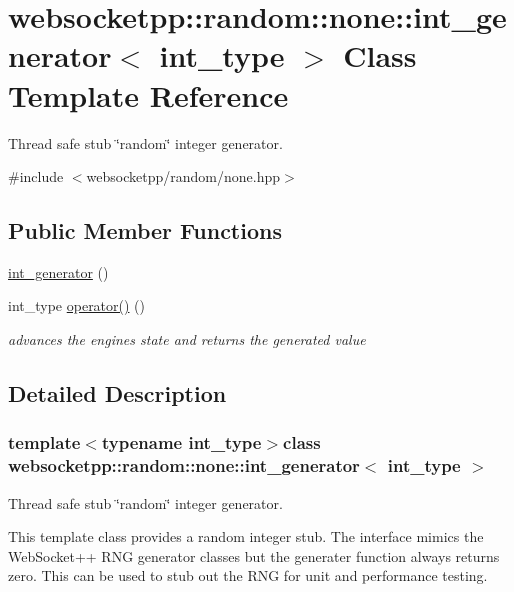 \hypertarget{classwebsocketpp_1_1random_1_1none_1_1int__generator}{}\section{websocketpp\+:\+:random\+:\+:none\+:\+:int\+\_\+generator$<$ int\+\_\+type $>$ Class Template Reference}
\label{classwebsocketpp_1_1random_1_1none_1_1int__generator}


Thread safe stub \char`\"{}random\char`\"{} integer generator.  




{\ttfamily \#include $<$websocketpp/random/none.\+hpp$>$}

\subsection*{Public Member Functions}
\begin{DoxyCompactItemize}
\item 
\hyperlink{classwebsocketpp_1_1random_1_1none_1_1int__generator_a74f4d568cdcfbd159819cb94b0932b70}{int\+\_\+generator} ()
\item 
int\+\_\+type \hyperlink{classwebsocketpp_1_1random_1_1none_1_1int__generator_aecc2404c6eef19dbb5e585344bdd9069}{operator()} ()
\begin{DoxyCompactList}\small\item\em advances the engine\textquotesingle{}s state and returns the generated value \end{DoxyCompactList}\end{DoxyCompactItemize}


\subsection{Detailed Description}
\subsubsection*{template$<$typename int\+\_\+type$>$class websocketpp\+::random\+::none\+::int\+\_\+generator$<$ int\+\_\+type $>$}

Thread safe stub \char`\"{}random\char`\"{} integer generator. 

This template class provides a random integer stub. The interface mimics the Web\+Socket++ R\+N\+G generator classes but the generater function always returns zero. This can be used to stub out the R\+N\+G for unit and performance testing.

